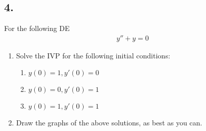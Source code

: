 \subsection*{4. }
For the following DE
\begin{align*}
	y'' + y = 0
\end{align*}
\begin{enumerate}
	\item Solve the IVP for the following initial conditions:
	      \begin{enumerate}
	      	\item $y(0) = 1 , y'(0) = 0$
	      	\item $y(0) = 0 , y'(0) = 1$
	      	\item $y(0) = 1 , y'(0) = 1$
	      \end{enumerate}
	\item Draw the graphs of the above solutions, as best as you can.
\end{enumerate}
\vspace{0.5em}


















